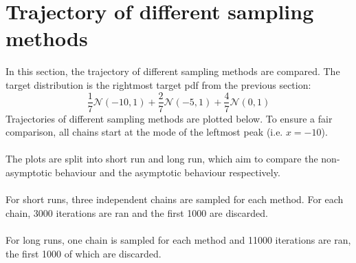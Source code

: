 \documentclass{article}
\theoremstyle{definition}
\newcommand{\1}{\mathbbm{1}}
\begin{document}
\section{Trajectory of different sampling methods}
In this section, the trajectory of different sampling methods are compared. The target distribution is the rightmost target pdf from the previous section:
\[ 
 \frac{1}{7} \mathcal{N}(-10, 1) + \frac{2}{7} \mathcal{N}(-5, 1) + \frac{4}{7}\mathcal{N}(0, 1)
 \]
Trajectories of different sampling methods are plotted below. To ensure a fair comparison, all chains start at the mode of the leftmost peak (i.e. $x=-10$). 
\\\\
The plots are split into short run and long run, which aim to compare the non-asymptotic behaviour and the asymptotic behaviour respectively.
\\\\
For short runs, three independent chains are sampled for each method. For each chain, 3000 iterations are ran and the first 1000 are discarded.
\\\\
For long runs, one chain is sampled for each method and 11000 iterations are ran, the first 1000 of which are discarded.
\end{document}
